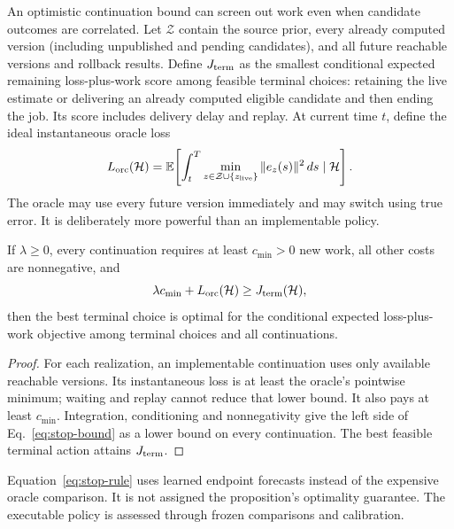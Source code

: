 An optimistic continuation bound can screen out work even when candidate outcomes are correlated. Let $\mathcal Z$ contain the source prior, every already computed version (including unpublished and pending candidates), and all future reachable versions and rollback results. Define $J_{\rm term}$ as the smallest conditional expected remaining loss-plus-work score among feasible terminal choices: retaining the live estimate or delivering an already computed eligible candidate and then ending the job. Its score includes delivery delay and replay. At current time $t$, define the ideal instantaneous oracle loss
\begin{equation}
L_{\rm orc}(\mathcal H)=\mathbb E\!\left[\int_t^T\min_{z\in\mathcal Z\cup\{z_{\rm live}\}}\|e_z(s)\|^2\,ds\mid\mathcal H\right].\label{eq:oracle}
\end{equation}
The oracle may use every future version immediately and may switch using true error. It is deliberately more powerful than an implementable policy.
\begin{proposition}\label{prop:stop}
If $\lambda\ge0$, every continuation requires at least $c_{\min}>0$ new work, all other costs are nonnegative, and
\begin{equation}
\lambda c_{\min}+L_{\rm orc}(\mathcal H)\ge J_{\rm term}(\mathcal H),\label{eq:stop-bound}
\end{equation}
then the best terminal choice is optimal for the conditional expected loss-plus-work objective among terminal choices and all continuations.
\end{proposition}
\begin{proof}
For each realization, an implementable continuation uses only available reachable versions. Its instantaneous loss is at least the oracle's pointwise minimum; waiting and replay cannot reduce that lower bound. It also pays at least $c_{\min}$. Integration, conditioning and nonnegativity give the left side of Eq.~\eqref{eq:stop-bound} as a lower bound on every continuation. The best feasible terminal action attains $J_{\rm term}$.
\end{proof}
Equation~\eqref{eq:stop-rule} uses learned endpoint forecasts instead of the expensive oracle comparison. It is not assigned the proposition's optimality guarantee. The executable policy is assessed through frozen comparisons and calibration.

